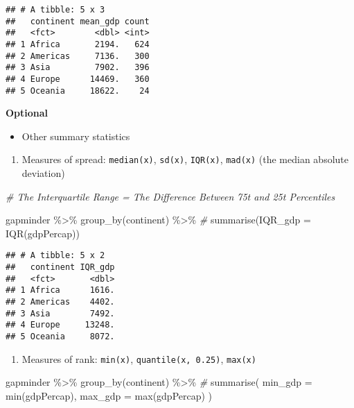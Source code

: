 \documentclass[
]{book}
\newenvironment{Shaded}{\begin{snugshade}}{\end{snugshade}}
\newcommand{\AttributeTok}[1]{\textcolor[rgb]{0.77,0.63,0.00}{#1}}
\newcommand{\CommentTok}[1]{\textcolor[rgb]{0.56,0.35,0.01}{\textit{#1}}}
\newcommand{\FunctionTok}[1]{\textcolor[rgb]{0.00,0.00,0.00}{#1}}
\newcommand{\NormalTok}[1]{#1}
\newcommand{\SpecialCharTok}[1]{\textcolor[rgb]{0.00,0.00,0.00}{#1}}
\providecommand{\tightlist}{%
  \setlength{\itemsep}{0pt}\setlength{\parskip}{0pt}}
\begin{document}
\begin{verbatim}
## # A tibble: 5 x 3
##   continent mean_gdp count
##   <fct>        <dbl> <int>
## 1 Africa       2194.   624
## 2 Americas     7136.   300
## 3 Asia         7902.   396
## 4 Europe      14469.   360
## 5 Oceania     18622.    24
\end{verbatim}

\textbf{Optional}

\begin{itemize}
\tightlist
\item
  Other summary statistics
\end{itemize}

\begin{enumerate}
\def\labelenumi{\arabic{enumi}.}
\tightlist
\item
  Measures of spread: \texttt{median(x)}, \texttt{sd(x)}, \texttt{IQR(x)}, \texttt{mad(x)} (the median absolute deviation)
\end{enumerate}

\begin{Shaded}
\begin{Highlighting}[]
\CommentTok{\# The Interquartile Range = The Difference Between 75t and 25t Percentiles}

\NormalTok{gapminder }\SpecialCharTok{\%\textgreater{}\%}
  \FunctionTok{group\_by}\NormalTok{(continent) }\SpecialCharTok{\%\textgreater{}\%} \CommentTok{\#}
  \FunctionTok{summarise}\NormalTok{(}\AttributeTok{IQR\_gdp =} \FunctionTok{IQR}\NormalTok{(gdpPercap))}
\end{Highlighting}
\end{Shaded}

\begin{verbatim}
## # A tibble: 5 x 2
##   continent IQR_gdp
##   <fct>       <dbl>
## 1 Africa      1616.
## 2 Americas    4402.
## 3 Asia        7492.
## 4 Europe     13248.
## 5 Oceania     8072.
\end{verbatim}

\begin{enumerate}
\def\labelenumi{\arabic{enumi}.}
\setcounter{enumi}{1}
\tightlist
\item
  Measures of rank: \texttt{min(x)}, \texttt{quantile(x,\ 0.25)}, \texttt{max(x)}
\end{enumerate}

\begin{Shaded}
\begin{Highlighting}[]
\NormalTok{gapminder }\SpecialCharTok{\%\textgreater{}\%}
  \FunctionTok{group\_by}\NormalTok{(continent) }\SpecialCharTok{\%\textgreater{}\%} \CommentTok{\#}
  \FunctionTok{summarise}\NormalTok{(}
    \AttributeTok{min\_gdp =} \FunctionTok{min}\NormalTok{(gdpPercap),}
    \AttributeTok{max\_gdp =} \FunctionTok{max}\NormalTok{(gdpPercap)}
\NormalTok{  )}
\end{Highlighting}
\end{Shaded}
\end{document}
